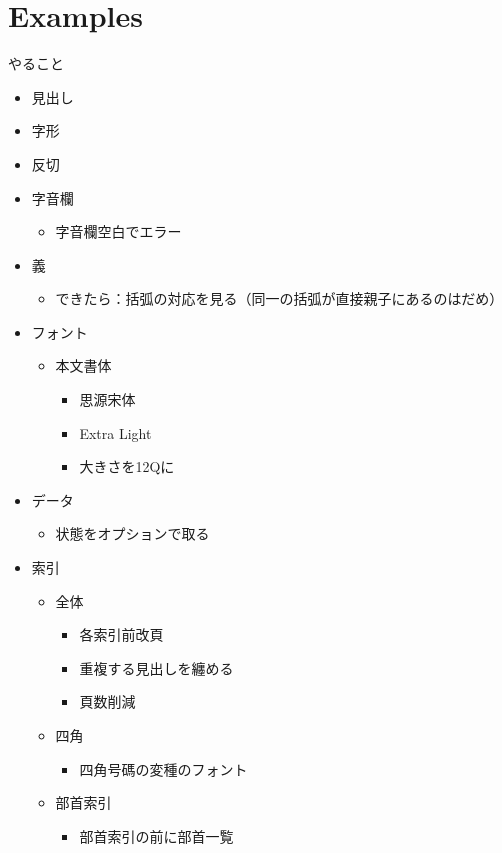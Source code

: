 \documentclass[a5paper,10pt,twoside]{article}
\begin{document}
\part{Examples}
やること
\begin{itemize}
\item{} 見出し
\item 字形
\item{} 反切
\item{} 字音欄
  \begin{itemize}
  \item{} 字音欄空白でエラー
  \end{itemize}
\item{} 義
  \begin{itemize}
  \item できたら：括弧の対応を見る（同一の括弧が直接親子にあるのはだめ）
  \end{itemize}
\item{} フォント
  \begin{itemize}
  \item{} 本文書体
    \begin{itemize}
    \item{} 思源宋体
    \item{} Extra Light
    \item{} 大きさを12Qに
    \end{itemize}
  \end{itemize}
\item{} データ
  \begin{itemize}
  \item{} 状態をオプションで取る
  \end{itemize}
\item{} 索引
  \begin{itemize}
  \item{} 全体
    \begin{itemize}
    \item{} 各索引前改頁
    \item{} 重複する見出しを纏める
    \item{} 頁数削減
    \end{itemize}
  \item{} 四角
    \begin{itemize}
    \item 四角号碼の変種のフォント
    \end{itemize}
  \item{} 部首索引
    \begin{itemize}
    \item 部首索引の前に部首一覧

\end{itemize}
\end{itemize}
\end{itemize}
\end{document}
